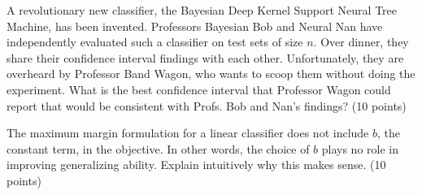 \documentclass[fleqn]{homework}
\begin{document}
  \begin{problem}{4}
    \begin{question}
      A revolutionary new classifier, the Bayesian Deep Kernel Support Neural
      Tree Machine, has been invented.  Professors Bayesian Bob and Neural Nan
      have independently evaluated such a classifier on test sets of size $n$.
      Over dinner, they share their confidence interval findings with each
      other.  Unfortunately, they are overheard by Professor Band Wagon, who
      wants to scoop them without doing the experiment.  What is the best
      confidence interval that Professor Wagon could report that would be
      consistent with Profs. Bob and Nan's findings? (10 points)
    \end{question}
  \end{problem}

  \begin{problem}{5}
    \begin{question}
      The maximum margin formulation for a linear classifier does not include
      $b$, the constant term, in the objective.  In other words, the choice of
      $b$ plays no role in improving generalizing ability.  Explain intuitively
      why this makes sense. (10 points)
    \end{question}
  \end{problem}
\end{document}
